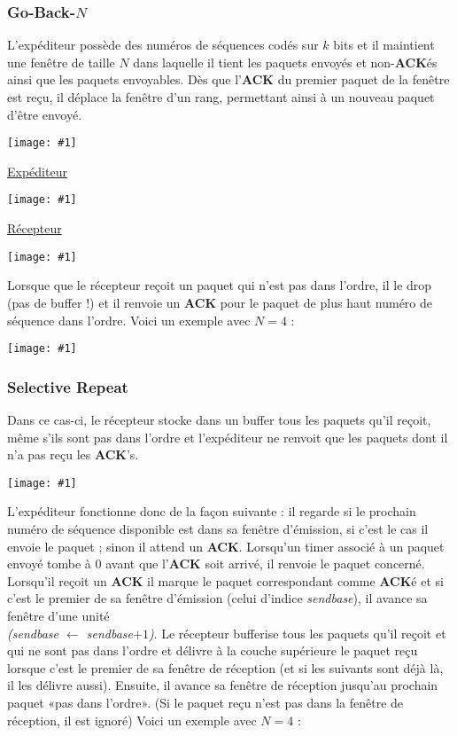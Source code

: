 \documentclass{article}
\newcommand{\imgR}[2]{\begin{center}\texttt{[image: \#1]}\end{center}}
\newcommand{\imgRT}[2]{\begin{center}\texttt{[image: \#1]}\end{center}}
\begin{document}
\subsubsection{Go-Back-$N$}

L'expéditeur possède des numéros de séquences codés sur $k$ bits et il maintient une fenêtre de taille $N$ dans
laquelle il tient les paquets envoyés et non-\textbf{ACK}és ainsi que les paquets envoyables. Dès que 
l'\textbf{ACK} du premier paquet de la fenêtre est reçu, il déplace la fenêtre d'un rang, permettant ainsi à un
nouveau paquet d'être envoyé.

\imgR{CN_038.png}{400}
\begin{center}\underline{Expéditeur}\end{center}
\imgR{CN_039.png}{400}
\begin{center}\underline{Récepteur}\end{center}
\imgR{CN_040.png}{400}

\newpage

Lorsque que le récepteur reçoit un paquet qui n'est pas dans l'ordre, il le drop (pas de buffer !) et il renvoie
un \textbf{ACK} pour le paquet de plus haut numéro de séquence dans l'ordre. Voici un exemple avec $N=4$ : 

\imgRT{CN_041.png}{300}

\subsubsection{Selective Repeat}

Dans ce cas-ci, le récepteur stocke dans un buffer tous les paquets qu'il reçoit, même s'ils sont pas dans 
l'ordre et l'expéditeur ne renvoit que les paquets dont il n'a pas reçu les \textbf{ACK}'s.

\imgR{CN_042.png}{400}
\newpage
L'expéditeur fonctionne donc de la façon suivante : il regarde si le prochain numéro de séquence disponible est
dans sa fenêtre d'émission, si c'est le cas il envoie le paquet ; sinon il attend un \textbf{ACK}. Lorsqu'un 
timer associé à un paquet envoyé tombe à 0 avant que l'\textbf{ACK} soit arrivé, il renvoie le paquet concerné. 
Lorsqu'il reçoit un \textbf{ACK} il marque le paquet correspondant comme \textbf{ACK}é et si c'est le premier 
de sa fenêtre d'émission (celui d'indice \textit{sendbase}), il avance sa fenêtre d'une unité \\
\textit{(sendbase $\leftarrow$ sendbase$+1$)}. Le récepteur bufferise tous les paquets qu'il reçoit et qui ne 
sont pas dans l'ordre et délivre à la couche supérieure le paquet reçu lorsque c'est le premier de sa fenêtre de
réception (et si les suivants sont déjà là, il les délivre aussi). Ensuite, il avance sa fenêtre de réception
jusqu'au prochain paquet «pas dans l'ordre». (Si le paquet reçu n'est pas dans la fenêtre de réception, il est 
ignoré) Voici un exemple avec $N=4$ : 
\end{document}
